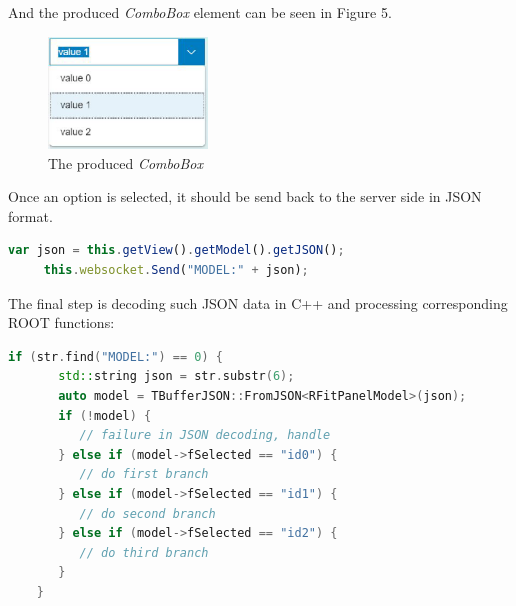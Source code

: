 \documentclass[a4paper]{jpconf}
\begin{document}
And the produced \textit{ComboBox} element can be seen in Figure 5.

\begin{figure}[h]
  \begin{center}
    \includegraphics[width=10pc]{testCombo.eps}\hspace{2pc}%
  \end{center}
  \centering
\begin{minipage}[b]{20pc}\caption{\label{label}The produced \textit{ComboBox}}
\end{minipage}
\end{figure}

Once an option is selected, it should be send back to the server side in JSON format.

\begin{lstlisting}[language=JavaScript,numbers=none]
     var json = this.getView().getModel().getJSON();
     this.websocket.Send("MODEL:" + json);
\end{lstlisting}

The final step is decoding such JSON data in C++ and processing corresponding ROOT functions:

\begin{lstlisting}[language=C++,numbers=none]
    if (str.find("MODEL:") == 0) {
       std::string json = str.substr(6);
       auto model = TBufferJSON::FromJSON<RFitPanelModel>(json);
       if (!model) {
          // failure in JSON decoding, handle
       } else if (model->fSelected == "id0") {
          // do first branch
       } else if (model->fSelected == "id1") {
          // do second branch
       } else if (model->fSelected == "id2") {
          // do third branch
       }
    }
\end{lstlisting}
\end{document}
